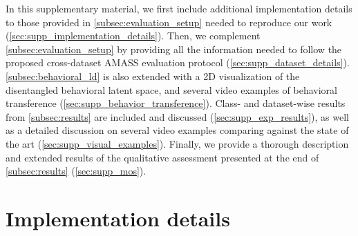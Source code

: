 \documentclass[10pt,twocolumn,letterpaper]{article}
\begin{document}
{\small


}


\clearpage
{}
\vspace{0.5cm}
In this supplementary material, we first include additional implementation details to those provided in \autoref{subsec:evaluation_setup} needed to reproduce our work (\autoref{sec:supp_implementation_details}). Then, we complement \autoref{subsec:evaluation_setup} by providing all the information needed to follow the proposed cross-dataset AMASS evaluation protocol (\autoref{sec:supp_dataset_details}). \autoref{subsec:behavioral_ld} is also extended with a 2D visualization of the disentangled behavioral latent space, and several video examples of behavioral transference (\autoref{sec:supp_behavior_transference}). Class- and dataset-wise results from \autoref{subsec:results} are included and discussed (\autoref{sec:supp_exp_results}), as well as a detailed discussion on several video examples comparing \modelname{} against the state of the art (\autoref{sec:supp_visual_examples}). Finally, we provide a thorough description and extended results of the qualitative assessment presented at the end of \autoref{subsec:results} (\autoref{sec:supp_mos}).

\renewcommand*{\thesection}{\Alph{section}}
\renewcommand*{\thefigure}{\Alph{figure}}
\renewcommand*{\thetable}{\Alph{table}}
\setcounter{section}{0}
\setcounter{table}{0}
\setcounter{figure}{0}
\section{Implementation details}
\label{sec:supp_implementation_details}

\def\obsT{B}
\def\predT{T}
\def\xmotion{\mathbf{x}_{m}}
\def\obs{\mathbf{X}}
\def\pred{\mathbf{Y}}

\def\encoder{\mathcal{E}}
\def\decoder{\mathcal{D}}
\def\ldFunction{f_{\Phi}}
\def\latcode{z}
\def\diffused{\latcode_{t}}
\def\diffusedPrev{\latcode_{t-1}}
\def\diffusedStart{\latcode_{0}}

\def\extPred{\pred_{e}}
\def\bvaeEncParams{\theta}
\def\bvaeDecParams{\phi}
\def\bvaeAuxDecParams{\omega}
\def\bvaeXmotionEncParams{\alpha}
\def\bvaeXmotionEnc{g_{\bvaeXmotionEncParams}}
\def\vaeObsEncParams{\lambda}
\def\vaeObsEnc{h_{\vaeObsEncParams}}
\def\bvaeDec{\mathcal{B}_{\bvaeDecParams}}
\def\bvaeEnc{p_{\bvaeEncParams}}
\def\bvaeAuxDec{\mathcal{A}_{\bvaeAuxDecParams}}
\end{document}
